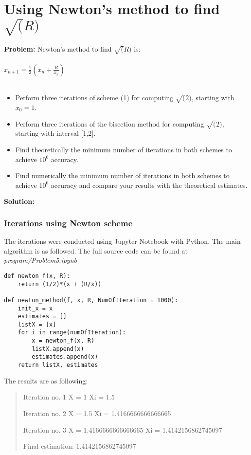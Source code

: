 \newpage

\section{Using Newton's method to find $\sqrt(R)$ }%
\label{sec:newton_s_method_to_find_sqrt_r_}

\textbf{Problem:}
Newton's method to find $\sqrt(R)$ is:\\
\\
$x_{n+1} = \frac{1}{2} (x_n + \frac{R}{x_n})$ \\
\\
\begin{itemize}
    \item Perform three iterations of scheme (1) for computing $\sqrt(2)$, starting with $x_0 = 1$.
    \item Perform three iterations of the bisection method for computing $\sqrt(2)$, starting with interval [1,2].
    \item Find theoretically the minimum number of iterations in both schemes to achieve $10^6$ accuracy.
    \item Find numerically the minimum number of iterations in both schemes to achieve $10^6$ accuracy and compare your results with the theoretical estimates.
\end{itemize}

\textbf{Solution:}
\subsubsection{Iterations using Newton scheme}
The iterations were conducted using Jupyter Notebook with Python. The main algorithm is as followed. The full source code can be found at \textit{program/Problem5.ipynb}
\begin{lstlisting}
def newton_f(x, R):
    return (1/2)*(x + (R/x))

def newton_method(f, x, R, NumOfIteration = 1000):
    init_x = x
    estimates = []
    listX = [x]
    for i in range(numOfIteration):
        x = newton_f(x, R)
        listX.append(x)
        estimates.append(x)
    return listX, estimates
\end{lstlisting}

The results are as following:
\begin{quote}
Iteration no. 1
X =  1
Xi =  1.5

Iteration no. 2
X =  1.5
Xi =  1.4166666666666665

Iteration no. 3
X =  1.4166666666666665
Xi =  1.4142156862745097

Final estimation:  1.4142156862745097
\end{quote}

